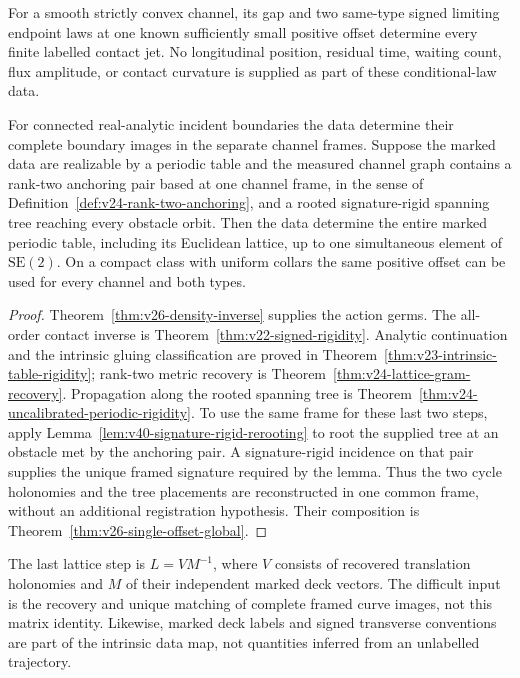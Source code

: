 \begin{theorem}
\label{thm:v26-intro-rigidity}
\label{thm:v25-intro-rigidity}
For a smooth strictly convex channel, its gap and two same-type signed
limiting endpoint laws at one known sufficiently small positive offset
 determine every finite labelled contact jet.  No longitudinal position,
residual time, waiting count, flux amplitude, or contact curvature is
supplied as part of these conditional-law data.

For connected real-analytic incident boundaries the data determine their
complete boundary images in the separate channel frames.  Suppose the
marked data are realizable by a periodic table and the measured channel
graph contains a rank-two anchoring pair based at one channel frame,
in the sense of Definition~\ref{def:v24-rank-two-anchoring}, and a rooted
signature-rigid spanning tree reaching every obstacle orbit.  Then the
data determine the entire marked periodic table,
including its Euclidean lattice, up to one simultaneous element of
\(\mathrm{SE}(2)\).  On a compact class with uniform collars the same
positive offset can be used for every channel and both types.
\end{theorem}

\begin{proof}
Theorem~\ref{thm:v26-density-inverse} supplies the action germs.  The
all-order contact inverse is Theorem~\ref{thm:v22-signed-rigidity}.
Analytic continuation and the intrinsic gluing classification are proved
in Theorem~\ref{thm:v23-intrinsic-table-rigidity}; rank-two metric recovery
is Theorem~\ref{thm:v24-lattice-gram-recovery}.  Propagation along the
rooted spanning tree is Theorem~\ref{thm:v24-uncalibrated-periodic-rigidity}.
To use the same frame for these last two steps, apply
Lemma~\ref{lem:v40-signature-rigid-rerooting} to root the supplied tree
at an obstacle met by the anchoring pair.  A signature-rigid incidence
on that pair supplies the unique framed signature required by the lemma.
Thus the two cycle holonomies and the tree placements are reconstructed
in one common frame, without an additional registration hypothesis.
Their composition is Theorem~\ref{thm:v26-single-offset-global}.
\end{proof}

The last lattice step is \(L=VM^{-1}\), where \(V\) consists of recovered
translation holonomies and \(M\) of their independent marked deck
vectors.  The difficult input is the recovery and unique matching of
complete framed curve images, not this matrix identity.  Likewise, marked
deck labels and signed transverse conventions are part of the intrinsic
data map, not quantities inferred from an unlabelled trajectory.

